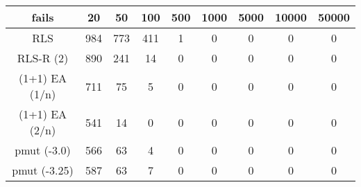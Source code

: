 \begin{tabular}[h]{ccccccccc}
fails&20&50&100&500&1000&5000&10000&50000\\\hline
RLS&984&773&411&1&0&0&0&0\\
RLS-R (2)&890&241&14&0&0&0&0&0\\
(1+1) EA (1/n)&711&75&5&0&0&0&0&0\\
(1+1) EA (2/n)&541&14&0&0&0&0&0&0\\
pmut (-3.0)&566&63&4&0&0&0&0&0\\
pmut (-3.25)&587&63&7&0&0&0&0&0\\
\end{tabular}
